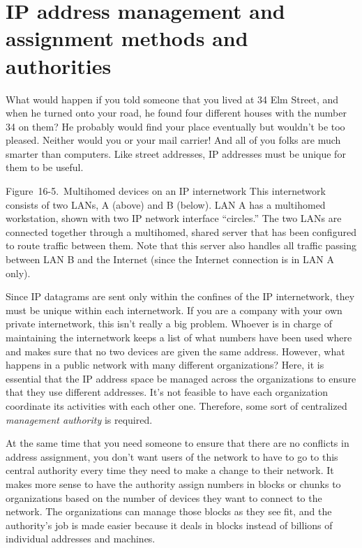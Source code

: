 \section{IP address management and assignment methods and authorities}
What would happen if you told someone that you lived at 34 Elm Street, and when he
turned onto your road, he found four different houses with the number 34
on them? He probably would find your place eventually but wouldn't be
too pleased. Neither would you or your mail carrier! And all of you
folks are much smarter than computers. Like street addresses, IP
addresses must be unique for them to be useful.



Figure~16-5.~Multihomed devices on an IP internetwork This internetwork
consists of two LANs, A (above) and B (below). LAN A has a multihomed
workstation, shown with two IP network interface ``circles.'' The two LANs
are connected together through a multihomed, shared server that has been
configured to route traffic between them. Note that this server also
handles all traffic passing between LAN B and the Internet (since the
Internet connection is in LAN A only).

Since IP datagrams are sent only within the confines of the IP
internetwork, they must be unique within each internetwork. If you are a
company with your own private internetwork, this isn't really a big
problem. Whoever is in charge of maintaining the internetwork keeps a
list of what numbers have been used where and makes sure that no two devices are
given the same address. However, what happens in a public network with
many different organizations? Here, it is essential that the IP address
space be managed across the organizations to ensure that they use
different addresses. It's not feasible to have each organization
coordinate its activities with each other one. Therefore, some sort of
centralized {\emph{management authority}} is required.

At the same time that you need someone to ensure that there are no
conflicts in address assignment, you don't want users of the network to
have to go to this central authority every time they need to make a
change to their network. It makes more sense to have the authority
assign numbers in blocks or chunks to organizations based on the number
of devices they want to connect to the network. The organizations can
manage those blocks as they see fit, and the authority's job is made
easier because it deals in blocks instead of billions of individual
addresses and machines.

